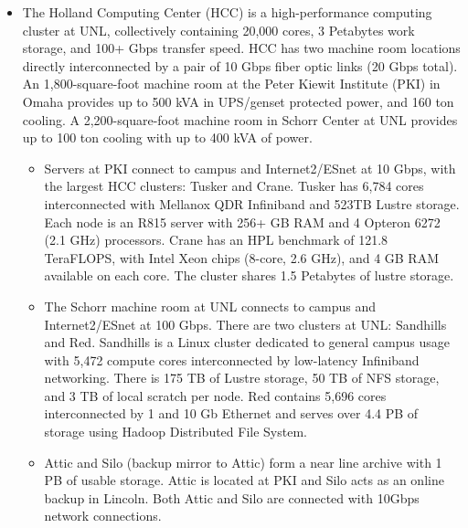 \documentclass[12pt,letterpaper]{article}
\begin{document}
\begin{itemize}
	\item The Holland Computing Center (HCC) is a high-performance computing
	cluster at UNL, collectively containing 20,000 cores, 3 Petabytes work
	storage, and 100+ Gbps transfer speed. HCC has two machine room locations
	directly interconnected by a pair of 10 Gbps fiber optic links (20 Gbps
	total). An 1,800-square-foot machine room at the Peter Kiewit Institute
	(PKI) in Omaha provides up to 500 kVA in UPS/genset protected power, and 160
	ton cooling. A 2,200-square-foot machine room in Schorr Center at UNL
	provides up to 100 ton cooling with up to 400 kVA of power.
	\begin{itemize}
		\item Servers at PKI connect to campus and Internet2/ESnet at 10 Gbps, with the largest HCC clusters: Tusker and Crane. Tusker has 6,784 cores interconnected with Mellanox QDR Infiniband and 523TB Lustre storage. Each node is an R815 server with 256+ GB RAM and 4 Opteron 6272 (2.1 GHz) processors. Crane has an HPL benchmark of 121.8 TeraFLOPS, with Intel Xeon chips (8-core, 2.6 GHz), and 4 GB RAM available on each core. The cluster shares 1.5 Petabytes of lustre storage.
		\item The Schorr machine room at UNL connects to campus and Internet2/ESnet at 100 Gbps. There are two clusters at UNL: Sandhills and Red. Sandhills is a Linux cluster dedicated to general campus usage with 5,472 compute cores interconnected by low-latency Infiniband networking. There is 175 TB of Lustre storage, 50 TB of NFS storage, and 3 TB of local scratch per node. Red contains 5,696 cores interconnected by 1 and 10 Gb Ethernet and serves over 4.4 PB of storage using Hadoop Distributed File System.
		\item Attic and Silo (backup mirror to Attic) form a near line archive with 1 PB of usable storage. Attic is located at PKI and Silo acts as an online backup in Lincoln. Both Attic and Silo are connected with 10Gbps network connections.
	\end{itemize}
\end{itemize}
\end{document}

